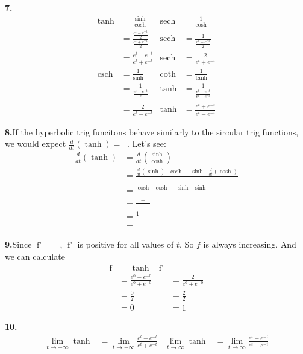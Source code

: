 \documentclass[12pt,]{book}
\theoremstyle{plain}
\theoremstyle{definition}
\numberwithin{equation}{section}
\newcommand{\fe}[2]{\mathop{{#1}{\left(#2\right)}}}
\newcommand{\fd}[1]{#1'}
\newcommand{\lzoo}[2]{{\frac{d}{d#1}}{\left(#2\right)}}
\newcommand{\sech}{\operatorname{sech}}
\newcommand{\csch}{\operatorname{csch}}
\begin{document}
\begin{multicols}{2}
{\noindent\textbf{7.}\quad{}\begin{align*}
\fe{\tanh}{t}&=\frac{\fe{\sinh}{t}}{\fe{\cosh}{t}}&\fe{\sech}{t}&=\frac{1}{\fe{\cosh}{t}}\\
&=\frac{\frac{e^t-e^{-t}}{2}}{\frac{e^t+e^{-t}}{2}}&\fe{\sech}{t}&=\frac{1}{\frac{e^t+e^{-t}}{2}}\\
&=\frac{e^t-e^{-t}}{e^t+e^{-t}}&\fe{\sech}{t}&=\frac{2}{e^t+e^{-t}}\\
\fe{\csch}{t}&=\frac{1}{\fe{\sinh}{t}}&\fe{\coth}{t}&=\frac{1}{\fe{\tanh}{t}}\\
&=\frac{1}{\frac{e^t-e^{-t}}{2}}&\fe{\tanh}{t}&=\frac{1}{\frac{e^t-e^{-t}}{e^t+e^{-t}}}\\
&=\frac{2}{e^t-e^{-t}}&\fe{\tanh}{t}&=\frac{e^t+e^{-t}}{e^t-e^{-t}}
\end{align*}%
\par\smallskip
\noindent\textbf{8.}\quad{}If the hyperbolic trig funcitons behave similarly to the sircular trig functions, we would expect \(\lzoo{t}{\fe{\tanh}{t}}=\fe{\sech^2}{t}\). Let's see:\begin{align*}
\lzoo{t}{\fe{\tanh}{t}}&=\lzoo{t}{\frac{\fe{\sinh}{t}}{\fe{\cosh}{t}}}\\
&=\frac{\lzoo{t}{\fe{\sinh}{t}}\cdot\fe{\cosh}{t}-\fe{\sinh}{t}\cdot\lzoo{t}{\fe{\cosh}{t}}}{\fe{\cosh^2}{t}}\\
&=\frac{\fe{\cosh}{t}\cdot\fe{\cosh}{t}-\fe{\sinh}{t}\cdot\fe{\sinh}{t}}{\fe{\cosh^2}{t}}\\
&=\frac{\fe{\cosh^2}{t}-\fe{\sinh^2}{t}}{\fe{\cosh^2}{t}}\\
&=\frac{1}{\fe{\cosh^2}{t}}\\
&=\fe{\sech^2}{t}
\end{align*}%
\par\smallskip
\noindent\textbf{9.}\quad{}Since \(\fe{\fd{f}}{t}=\fe{\sech^2}{t}\), \(\fe{\fd{f}}{t}\) is positive for all values of \(t\). So \(f\) is always increasing. And we can calculate\begin{align*}
\fe{f}{0}&=\fe{\tanh}{0}&\fe{\fd{f}}{0}&=\fe{\sech^2}{0}\\
&=\frac{e^0-e^{-0}}{e^0+e^{-0}}&&=\frac{2}{e^0+e^{-0}}\\
&=\frac{0}{2}&&=\frac{2}{2}\\
&=0&&=1
\end{align*}%
\par\smallskip
\noindent\textbf{10.}\quad{}\begin{align*}
\lim_{t\to-\infty}\fe{\tanh}{t}&=\lim_{t\to-\infty}\frac{e^t-e^{-t}}{e^t+e^{-t}}&\lim_{t\to\infty}\fe{\tanh}{t}&=\lim_{t\to\infty}\frac{e^t-e^{-t}}{e^t+e^{-t}}\\

\end{align*}}
\end{multicols}
\end{document}

